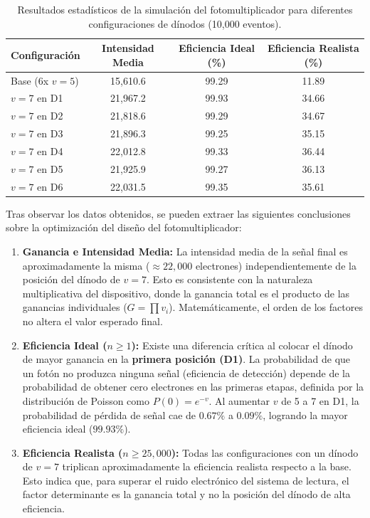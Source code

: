 \documentclass[11pt,a4paper]{article}
\begin{document}
\begin{table}[H]
    \centering
    \caption{Resultados estadísticos de la simulación del fotomultiplicador para diferentes configuraciones de dínodos (10,000 eventos).}
    \begin{tabular}{lccc}
        \toprule
        Configuración & Intensidad Media & Eficiencia Ideal (\%) & Eficiencia Realista (\%) \\
        \midrule
        Base (6x $v=5$)       & 15,610.6 & 99.29 & 11.89 \\
        $v=7$ en D1           & 21,967.2 & 99.93 & 34.66 \\
        $v=7$ en D2           & 21,818.6 & 99.29 & 34.67 \\
        $v=7$ en D3           & 21,896.3 & 99.25 & 35.15 \\
        $v=7$ en D4           & 22,012.8 & 99.33 & 36.44 \\
        $v=7$ en D5           & 21,925.9 & 99.27 & 36.13 \\
        $v=7$ en D6           & 22,031.5 & 99.35 & 35.61 \\
        \bottomrule
    \end{tabular}
    \label{tab:eficiencia_pmt}
\end{table}

Tras observar los datos obtenidos, se pueden extraer las siguientes conclusiones sobre la optimización del diseño del fotomultiplicador:

\begin{enumerate}
    \item \textbf{Ganancia e Intensidad Media:} La intensidad media de la señal final es aproximadamente la misma ($\approx 22,000$ electrones) independientemente de la posición del dínodo de $v=7$. Esto es consistente con la naturaleza multiplicativa del dispositivo, donde la ganancia total es el producto de las ganancias individuales ($G = \prod v_i$). Matemáticamente, el orden de los factores no altera el valor esperado final.
    
    \item \textbf{Eficiencia Ideal ($n \ge 1$):} Existe una diferencia crítica al colocar el dínodo de mayor ganancia en la \textbf{primera posición (D1)}. La probabilidad de que un fotón no produzca ninguna señal (eficiencia de detección) depende de la probabilidad de obtener cero electrones en las primeras etapas, definida por la distribución de Poisson como $P(0) = e^{-v}$. Al aumentar $v$ de 5 a 7 en D1, la probabilidad de pérdida de señal cae de $0.67\%$ a $0.09\%$, logrando la mayor eficiencia ideal ($99.93\%$).
    
    \item \textbf{Eficiencia Realista ($n \ge 25,000$):} Todas las configuraciones con un dínodo de $v=7$ triplican aproximadamente la eficiencia realista respecto a la base. Esto indica que, para superar el ruido electrónico del sistema de lectura, el factor determinante es la ganancia total y no la posición del dínodo de alta eficiencia.
\end{enumerate}
\end{document}

